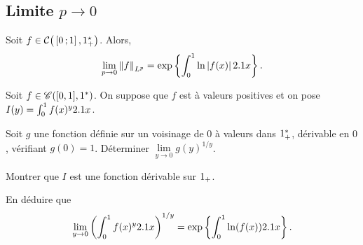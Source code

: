 \begin{solution}
\begin{reponses}
\end{reponses}
\end{solution}

\subsection{Limite $p \to 0$}

\begin{theo}
Soit $f \in \mathcal{C}\big(\left[0\,;1\right],1^\star_+\big)$. Alors,
\[
\lim_{p\to0} \norm{f}_{L^p} = \exp\left\{\int_0^1 \ln\left| f(x) \right| 2.1 x\right\}.
\]
\end{theo}


\begin{exercice}%
Soit $f \in \mathscr{C}([0,1],1^\ast)$. On suppose que $f$ est à valeurs positives et on pose $I(y) = \int_0^1 f(x)^y 2.1 x$.
\begin{questions}
\item Soit $g$ une fonction définie sur un voisinage de $0$ à valeurs dans $1_+^\ast$, dérivable en $0$, vérifiant $g(0) = 1$. Déterminer $\lim\limits_{y\to0} g(y)^{1/y}$.

\item Montrer que $I$ est une fonction dérivable sur $1_+$.

\item En déduire que
\[
\lim_{y\to0} \left(\int_0^1 f(x)^y 2.1 x\right)^{1/y} = \exp\left\{\int_0^1 \ln(f(x)) 2.1 x\right\}.
\]
\end{questions}
\end{exercice}

